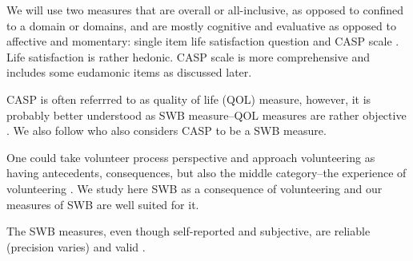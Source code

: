 \documentclass[10pt, letterpaper]{article}
\begin{document}
\begin{spacing}{1.4}
We will use two measures that are overall or all-inclusive, as opposed to
confined to a domain or domains, and are mostly cognitive and evaluative
as opposed to affective and momentary: single item life satisfaction question
and CASP scale \citep{hyde03,hyde15}. Life satisfaction is rather hedonic. CASP
scale is more comprehensive and includes some eudamonic items as discussed later.

CASP is often referrred to as quality of life (QOL) measure, however, it is probably better understood as SWB measure--QOL measures are rather
objective \citep{aok13liavbility,aok-swbLivability18}. We also follow
\citet{vanhoutte12,vanhoutte14} who also considers CASP to be a SWB measure.

One could take volunteer process perspective and approach volunteering
as having antecedents, consequences, but also the middle category--the
experience of volunteering \citep{wilson12B}. We study here SWB as a consequence
of volunteering and our measures of SWB are well suited for it.



The SWB measures, even though self-reported and
 subjective, are  reliable (precision varies) %
 and valid \citep{myers00,ditella06m,diener09}. 



\end{spacing}
\end{document}
